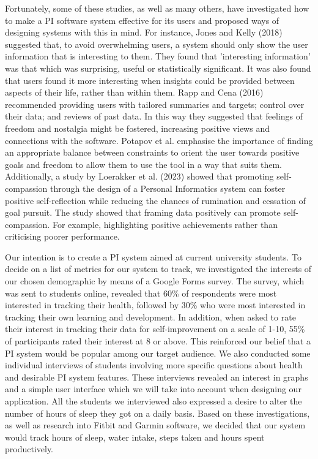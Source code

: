 \documentclass[12pt]{article}
\begin{document}
Fortunately, some of these studies, as well as many others, have investigated
how to make a PI software system effective for its users and proposed ways of
designing systems with this in mind. For instance, Jones and Kelly (2018)
suggested that, to avoid overwhelming users, a system should only show the user
information that is interesting to them. They found that 'interesting
information' was that which was surprising, useful or statistically
significant. It was also found that users found it more interesting when
insights could be provided between aspects of their life, rather than within
them. Rapp and Cena (2016) recommended providing users with tailored summaries
and targets; control over their data; and reviews of past data. In this way
they suggested that feelings of freedom and nostalgia might be fostered,
increasing positive views and connections with the software. Potapov et al.
emphasise the importance of finding an appropriate balance between constraints
to orient the user towards positive goals and freedom to allow them to use the
tool in a way that suits them. Additionally, a study by Loerakker et al. (2023)
showed that promoting self-compassion through the design of a Personal
Informatics system can foster positive self-reflection while reducing the
chances of rumination and cessation of goal pursuit. The study showed that
framing data positively can promote self-compassion. For example, highlighting
positive achievements rather than criticising poorer performance.\par

Our intention is to create a PI system aimed at current university students. To
decide on a list of metrics for our system to track, we investigated the
interests of our chosen demographic by means of a Google Forms survey. The
survey, which was sent to students online, revealed that 60\% of respondents
were most interested in tracking their health, followed by 30\% who were most
interested in tracking their own learning and development. In addition, when
asked to rate their interest in tracking their data for self-improvement on a
scale of 1-10, 55\% of participants rated their interest at 8 or above. This
reinforced our belief that a PI system would be popular among our target
audience. We also conducted some individual interviews of students involving
more specific questions about health and desirable PI system features. These
interviews revealed an interest in graphs and a simple user interface which we
will take into account when designing our application. All the students we
interviewed also expressed a desire to alter the number of hours of sleep they
got on a daily basis. Based on these investigations, as well as research into
Fitbit and Garmin software, we decided that our system would track hours of
sleep, water intake, steps taken and hours spent productively.\par
\end{document}
